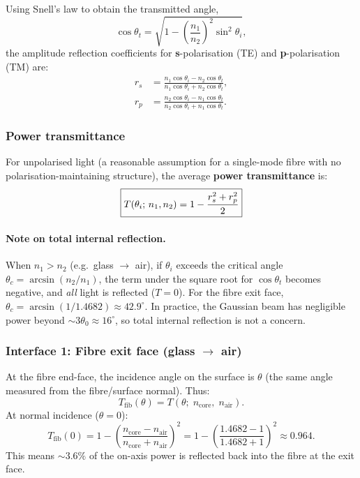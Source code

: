Using Snell's law to obtain the transmitted angle,
%
\begin{equation}
  \cos\theta_t = \sqrt{1 - \left(\frac{n_1}{n_2}\right)^2 \sin^2\theta_i},
\end{equation}
%
the amplitude reflection coefficients for \textbf{s}-polarisation (TE)
and \textbf{p}-polarisation (TM) are:
%
\begin{align}
  r_s &= \frac{n_1\cos\theta_i - n_2\cos\theta_t}
              {n_1\cos\theta_i + n_2\cos\theta_t},
  \label{eq:rs} \\[6pt]
  r_p &= \frac{n_2\cos\theta_i - n_1\cos\theta_t}
              {n_2\cos\theta_i + n_1\cos\theta_t}.
  \label{eq:rp}
\end{align}

\subsubsection{Power transmittance}

For unpolarised light (a reasonable assumption for a single-mode fibre
with no polarisation-maintaining structure), the average \textbf{power
transmittance} is:
%
\begin{equation}\label{eq:fresnel-T}
  \boxed{%
    T(\theta_i;\, n_1, n_2)
    = 1 - \frac{r_s^2 + r_p^2}{2}
  }
\end{equation}

\paragraph{Note on total internal reflection.}
When $n_1 > n_2$ (e.g.\ glass $\to$ air), if $\theta_i$ exceeds the
critical angle $\theta_c = \arcsin(n_2/n_1)$, the term under the
square root for $\cos\theta_t$ becomes negative, and \emph{all} light
is reflected ($T = 0$).  For the fibre exit face,
$\theta_c = \arcsin(1/1.4682) \approx 42.9^\circ$.  In practice, the
Gaussian beam has negligible power beyond $\sim\!3\theta_0 \approx
16^\circ$, so total internal reflection is not a concern.

\subsubsection{Interface 1: Fibre exit face (glass $\to$ air)}

At the fibre end-face, the incidence angle on the surface is $\theta$
(the same angle measured from the fibre/surface normal).  Thus:
%
\begin{equation}\label{eq:T-fib}
  T_\text{fib}(\theta) = T(\theta;\; n_\text{core},\; n_\text{air}).
\end{equation}
%
At normal incidence ($\theta = 0$):
%
\begin{equation}
  T_\text{fib}(0)
  = 1 - \left(\frac{n_\text{core} - n_\text{air}}
                    {n_\text{core} + n_\text{air}}\right)^{\!2}
  = 1 - \left(\frac{1.4682 - 1}{1.4682 + 1}\right)^{\!2}
  \approx 0.964.
\end{equation}
%
This means ${\sim}3.6\%$ of the on-axis power is reflected back into
the fibre at the exit face.

